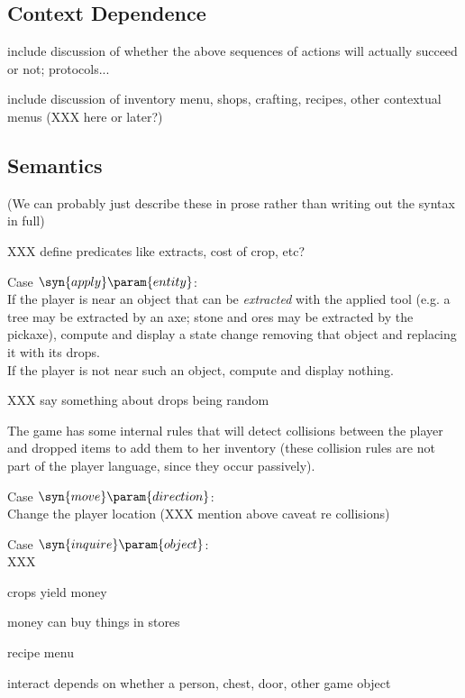 

\subsection{Context Dependence}

include discussion of whether the above sequences of actions will actually
succeed or not; protocols...

include discussion of inventory menu, shops, crafting, recipes, other contextual menus
(XXX here or later?)

\subsection{Semantics}

(We can probably just describe these in prose rather than writing out the
syntax in full)

XXX define predicates like extracts, cost of crop, etc?

Case $\syn{apply}\param{entity}$:\\
If the player is near an object that can be {\em extracted} with the
applied tool (e.g. a tree may be extracted by an axe; stone and ores may be
extracted by the pickaxe), compute and display a state change removing that object and
replacing it with its drops. \\
If the player is not near such an object, compute and display nothing.

XXX say something about drops being random

The game has some internal rules that will detect collisions between the
player and dropped items to add them to her inventory (these collision
rules are not part of the player language, since they occur passively).

Case $\syn{move}\param{direction}$:\\
Change the player location (XXX mention above caveat re collisions)


Case $\syn{inquire}\param{object}$:\\
XXX

crops yield money

money can buy things in stores

recipe menu

interact depends on whether a person, chest, door, other game object


